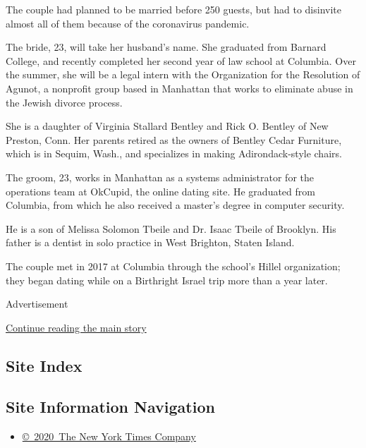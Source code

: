 The couple had planned to be married before 250 guests, but had to
disinvite almost all of them because of the coronavirus pandemic.

The bride, 23, will take her husband's name. She graduated from Barnard
College, and recently completed her second year of law school at
Columbia. Over the summer, she will be a legal intern with the
Organization for the Resolution of Agunot, a nonprofit group based in
Manhattan that works to eliminate abuse in the Jewish divorce process.

She is a daughter of Virginia Stallard Bentley and Rick O. Bentley of
New Preston, Conn. Her parents retired as the owners of Bentley Cedar
Furniture, which is in Sequim, Wash., and specializes in making
Adirondack-style chairs.

The groom, 23, works in Manhattan as a systems administrator for the
operations team at OkCupid, the online dating site. He graduated from
Columbia, from which he also received a master's degree in computer
security.

He is a son of Melissa Solomon Tbeile and Dr. Isaac Tbeile of Brooklyn.
His father is a dentist in solo practice in West Brighton, Staten
Island.

The couple met in 2017 at Columbia through the school's Hillel
organization; they began dating while on a Birthright Israel trip more
than a year later.

Advertisement

\protect\hyperlink{after-bottom}{Continue reading the main story}

\hypertarget{site-index}{%
\subsection{Site Index}\label{site-index}}

\hypertarget{site-information-navigation}{%
\subsection{Site Information
Navigation}\label{site-information-navigation}}

\begin{itemize}
\tightlist
\item
  \href{https://help.nytimes3xbfgragh.onion/hc/en-us/articles/115014792127-Copyright-notice}{©~2020~The
  New York Times Company}
\end{itemize}

